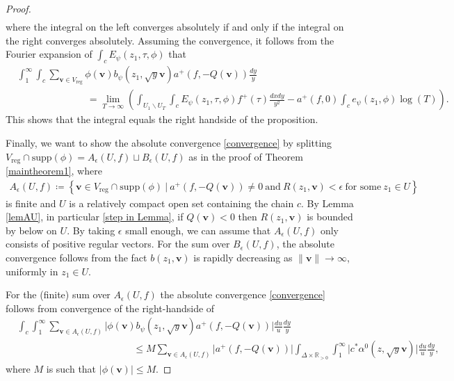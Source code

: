 \documentclass[twoside,a4paper,10pt]{article} %
\newcommand{\dxdy}{\frac{dxdy}{y^2}}
\newcommand{\8}{\infty}
\newcommand{\vbf}{\mathbf{v}}
\newcommand{\R}{\mathbb{R}}
\newcommand{\reg}{\mathrm{reg}}
\newcommand{\supp}{\mathrm{supp}}
\theoremstyle{mytheoremstyle}
\theoremstyle{remark}
\numberwithin{equation}{section}
\begin{document}
\begin{proof}
\begin{align}
\end{align}
where the integral on the left converges absolutely if and only if the integral on the right converges absolutely. Assuming the convergence, it follows from the Fourier expansion
of $\int_{c}E_\psi(z_1,\tau,\phi)$ that
\begin{align}
& \int_1^\8 \int_{c} \sum_{\vbf \in V_\reg} \phi(\vbf) b_\psi(z_1,\sqrt{y}\vbf)a^+(f,-Q(\vbf)) \frac{dy}{y} \\
& \hspace{3cm} = \lim_{T\rightarrow \8} \left ( \int_{U_1 \smallsetminus U_T} \int_{c} E_{\psi}(z_1,\tau,\phi)f^+(\tau) \dxdy -a^+(f,0)\int_{c}e_\psi(z_1,\phi)\log(T) \right ).
\end{align}
This shows that the integral equals the right handside of the proposition.

Finally, we want to show the absolute convergence \eqref{convergence}  by splitting $V_\reg \cap \supp(\phi) = A_\epsilon(U,f) \sqcup B_\epsilon(U,f)$ as in the proof of Theorem \ref{maintheorem1}, where
\begin{align}
A_\epsilon(U,f) \coloneqq \left \{ \vbf \in V_\reg \cap \supp(\phi) \ \vert \ a^+(f,-Q(\vbf)) \neq 0 \ \textrm{and} \ R(z_1,\vbf) < \epsilon \ \textrm{for some} \ z_1 \in U \right \}
\end{align}
is finite and $U$ is a relatively compact open set containing the chain $c$. By Lemma \ref{lemAU}, in particular \eqref{step in Lemma}, if $Q(\vbf)<0$ then $R(z_1,\vbf)$ is bounded by below on $U$. By taking $\epsilon$ small enough, we can assume that $A_\epsilon(U,f)$ only consists of positive regular vectors. For the sum over $B_\epsilon(U,f)$, the absolute convergence follows from the fact  $b(z_1, \vbf)$ is rapidly decreasing as $\lVert \vbf \rVert \rightarrow \8$, uniformly in $z_1 \in U$.

For the (finite) sum over $A_\epsilon(U,f)$ the absolute convergence \eqref{convergence} follows from convergence of the right-handside of
\begin{align} & \int_{c} \int_1^\8 \sum_{\vbf \in A_\epsilon(U,f)} \vert \phi(\vbf)b_\psi(z_1,\sqrt{y}\vbf) a^+(f,-Q(\vbf))\vert \frac{du}{u}\frac{dy}{y} \\
& \hspace{5cm} \leq M \sum_{\vbf \in A_\epsilon(U,f)} \vert a^+(f,-Q(\vbf))\vert \int_{\Delta \times \R_{>0}}  \int_1^\8 \vert c^\ast \alpha^0(z,\sqrt{y}\vbf) \vert \frac{du}{u}\frac{dy}{y},
\end{align}
where $M$ is such that $\vert \phi(\vbf) \vert \leq M$. 





\end{proof}
\end{document}
